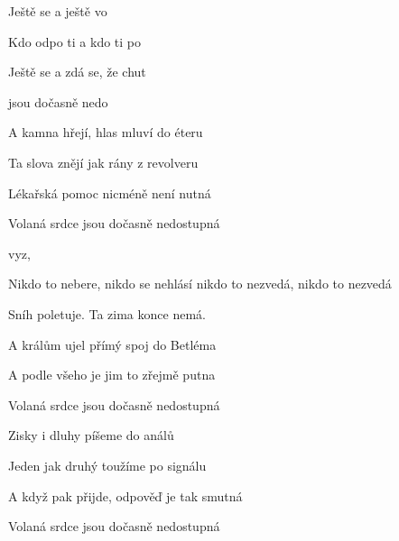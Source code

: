 


\zs
Ještě se  a ještě  vo

Kdo odpo ti a kdo ti  po

Ještě se  a zdá se, že  chut

  jsou dočasně nedo
\ks

\zs
A kamna hřejí, hlas mluví do éteru

Ta slova znějí jak rány z revolveru

Lékařská pomoc nicméně není nutná

Volaná srdce jsou dočasně nedostupná
\ks

\zr
{}   vyz,       

Nikdo to nebere,
nikdo se nehlásí
nikdo to nezvedá,
nikdo to nezvedá
\kr

\zs
Sníh poletuje. Ta zima konce nemá.

A králům ujel přímý spoj do Betléma

A podle všeho je jim to zřejmě putna

Volaná srdce jsou dočasně nedostupná
\ks

\zs
Zisky i dluhy píšeme do análů

Jeden jak druhý toužíme po signálu

A když pak přijde, odpověď je tak smutná

Volaná srdce jsou dočasně nedostupná
\ks

\kp







